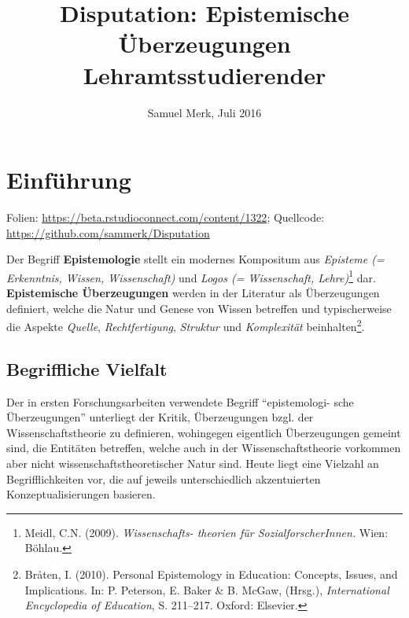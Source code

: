 \documentclass[]{tufte-handout}
\title{Disputation: Epistemische Überzeugungen \mbox{Lehramtsstudierender}}
\date{Samuel Merk, Juli 2016}
\begin{document}
\maketitle




\section{Einführung}\label{einfuhrung}

\begin{marginfigure}
Folien: \url{https://beta.rstudioconnect.com/content/1322}; Quellcode:
\url{https://github.com/sammerk/Disputation}
\end{marginfigure}

Der Begriff \textbf{Epistemologie} stellt ein modernes Kompositum aus
\emph{Episteme (= Erkenntnis, Wissen, Wissenschaft)} und \emph{Logos (=
Wissenschaft, Lehre)}\footnote{Meidl, C.N. (2009).
  \emph{Wissenschafts- theorien für SozialforscherInnen.} Wien: Böhlau.}
dar. \textbf{Epistemische Überzeugungen} werden in der Literatur als
Überzeugungen definiert, welche die Natur und Genese von Wissen
betreffen und typischerweise die Aspekte \emph{Quelle},
\emph{Rechtfertigung}, \emph{Struktur} und \emph{Komplexität}
beinhalten\footnote{Bråten, I. (2010). Personal Epistemology in
  Education: Concepts, Issues, and Implications. In: P. Peterson, E.
  Baker \& B. McGaw, (Hrsg.), \emph{International Encyclopedia of
  Education}, S. 211--217. Oxford: Elsevier.}.

\subsection{Begriffliche Vielfalt}\label{begriffliche-vielfalt}

Der in ersten Forschungsarbeiten verwendete Begriff ``epistemologi- sche
Überzeugungen'' unterliegt der Kritik, Überzeugungen bzgl. der
Wissenschaftstheorie zu definieren, wohingegen eigentlich Überzeugungen
gemeint sind, die Entitäten betreffen, welche auch in der
Wissenschaftstheorie vorkommen aber nicht wissenschaftstheoretischer
Natur sind. Heute liegt eine Vielzahl an Begrifflichkeiten vor, die
auf jeweils unterschiedlich akzentuierten Konzeptualisierungen basieren.
\end{document}
